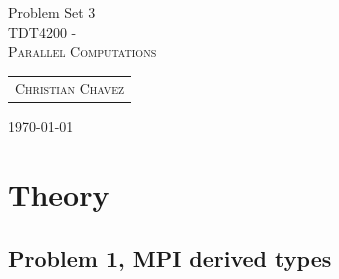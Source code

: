 \documentclass[fontsize=11pt, paper=a4, titlepage]{article}
\begin{document}
\begin{center}

{\huge Problem Set 3}\\[0.5cm]

\textsc{\LARGE TDT4200 -}\\[0.5cm]
\textsc{\large Parallel Computations}\\[1.0cm]

\begin{table}[h]
    \centering
    \begin{tabular}{c}
        \textsc{Christian Chavez}
    \end{tabular}
\end{table}

\end{center}
\vfill
\hfill \large{\today}
\clearpage

\section{Theory}
\subsection{Problem 1, MPI derived types}
\end{document}

